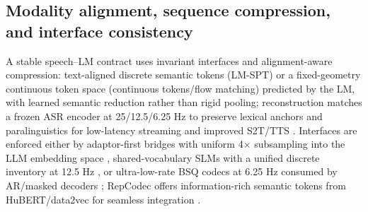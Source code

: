 \documentclass{article}
\begin{document}
\subsection{Modality alignment, sequence compression, and interface consistency} \label{subsec:modalityalignment,sequencecompression,andinterfaceconsistency}
A stable speech--LM contract uses invariant interfaces and alignment-aware compression: text-aligned discrete semantic tokens (LM-SPT) or a fixed-geometry continuous token space (continuous tokens/flow matching) predicted by the LM, with learned semantic reduction rather than rigid pooling; reconstruction matches a frozen ASR encoder at 25/12.5/6.25 Hz to preserve lexical anchors and paralinguistics for low-latency streaming and improved S2T/TTS \cite{jo2025lmsptalignedsemanticdistillationspeechto,yuan2024continuousspeechtokensmakesllmsrobustmul}. Interfaces are enforced either by adaptor-first bridges with uniform 4$\times$ subsampling into the LLM embedding space \cite{wang2023slmbridgethingapbetweenspeechtextfoundat}, shared-vocabulary SLMs with a unified discrete inventory at 12.5 Hz \cite{zeng2024scalingspeechtextpretrainingsyntheticint}, or ultra-low-rate BSQ codecs at 6.25 Hz consumed by AR/masked decoders \cite{wang2025tadicodectextawarediffusionspeechtokeniz}; RepCodec offers information-rich semantic tokens from HuBERT/data2vec for seamless integration \cite{huang2024repcodecspeechrepresentationcodectokeniz}.
\end{document}
